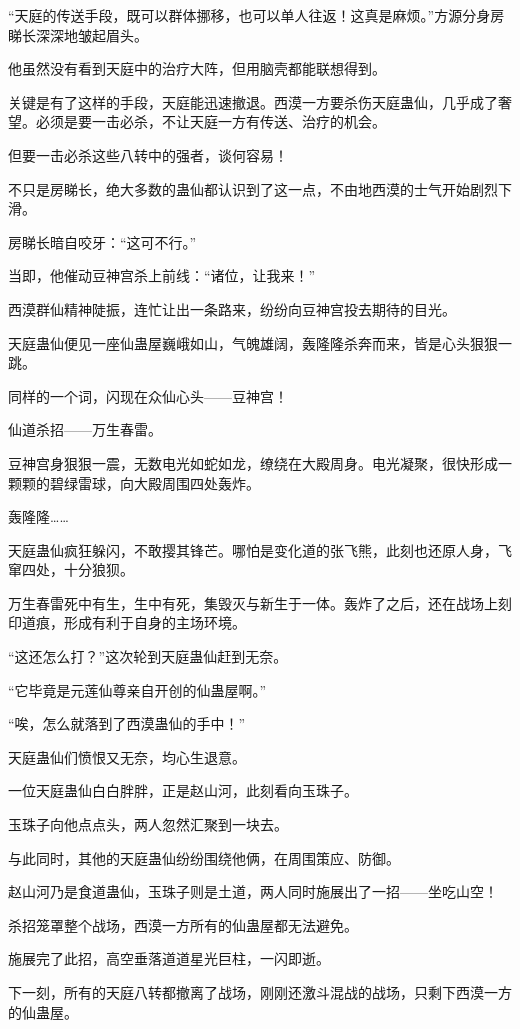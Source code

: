 \begin{this_body}
“天庭的传送手段，既可以群体挪移，也可以单人往返！这真是麻烦。”方源分身房睇长深深地皱起眉头。

他虽然没有看到天庭中的治疗大阵，但用脑壳都能联想得到。

关键是有了这样的手段，天庭能迅速撤退。西漠一方要杀伤天庭蛊仙，几乎成了奢望。必须是要一击必杀，不让天庭一方有传送、治疗的机会。

但要一击必杀这些八转中的强者，谈何容易！

不只是房睇长，绝大多数的蛊仙都认识到了这一点，不由地西漠的士气开始剧烈下滑。

房睇长暗自咬牙：“这可不行。”

当即，他催动豆神宫杀上前线：“诸位，让我来！”

西漠群仙精神陡振，连忙让出一条路来，纷纷向豆神宫投去期待的目光。

天庭蛊仙便见一座仙蛊屋巍峨如山，气魄雄阔，轰隆隆杀奔而来，皆是心头狠狠一跳。

同样的一个词，闪现在众仙心头——豆神宫！

仙道杀招——万生春雷。

豆神宫身狠狠一震，无数电光如蛇如龙，缭绕在大殿周身。电光凝聚，很快形成一颗颗的碧绿雷球，向大殿周围四处轰炸。

轰隆隆……

天庭蛊仙疯狂躲闪，不敢撄其锋芒。哪怕是变化道的张飞熊，此刻也还原人身，飞窜四处，十分狼狈。

万生春雷死中有生，生中有死，集毁灭与新生于一体。轰炸了之后，还在战场上刻印道痕，形成有利于自身的主场环境。

“这还怎么打？”这次轮到天庭蛊仙赶到无奈。

“它毕竟是元莲仙尊亲自开创的仙蛊屋啊。”

“唉，怎么就落到了西漠蛊仙的手中！”

天庭蛊仙们愤恨又无奈，均心生退意。

一位天庭蛊仙白白胖胖，正是赵山河，此刻看向玉珠子。

玉珠子向他点点头，两人忽然汇聚到一块去。

与此同时，其他的天庭蛊仙纷纷围绕他俩，在周围策应、防御。

赵山河乃是食道蛊仙，玉珠子则是土道，两人同时施展出了一招——坐吃山空！

杀招笼罩整个战场，西漠一方所有的仙蛊屋都无法避免。

施展完了此招，高空垂落道道星光巨柱，一闪即逝。

下一刻，所有的天庭八转都撤离了战场，刚刚还激斗混战的战场，只剩下西漠一方的仙蛊屋。


\end{this_body}
